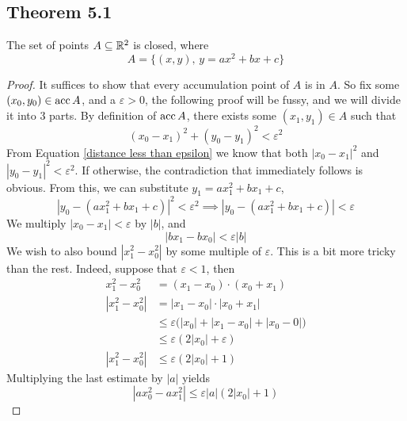 \documentclass[../../main.tex]{subfiles}
\begin{document}
\subsection{Theorem 5.1}
\begin{wts}
The set of points $A\subseteq\mathbb{R}^2$ is closed, where
\[
A = \{(x,y),\, y=ax^2 + bx + c\}
\]
\end{wts}
\begin{proof}
    It suffices to show that every accumulation point of $A$ is in $A$. So fix some $(x_0,y_0)\in \operatorname{acc}{A}$, and a $\varepsilon>0$, the following proof will be fussy, and we will divide it into 3 parts. By definition of $\operatorname{acc}{A}$, there exists some $(x_1,y_1)\in A$ such that
    \begin{equation}\label{distance less than epsilon}
        (x_0-x_1)^2 + (y_0-y_1)^2<\varepsilon^2
    \end{equation}
    From Equation \eqref{distance less than epsilon} we know that both $|x_0-x_1|^2$ and $|y_0-y_1|^2<\varepsilon^2$. If otherwise, the contradiction that immediately follows is obvious. From this, we can substitute $y_1 = ax^2_1 + bx_1 + c$, 
    \begin{equation}\label{y1 equation}
    \left|y_0 - (ax_1^2 + bx_1 + c)\right|^2<\varepsilon^2\implies \left|y_0 - (ax_1^2 + bx_1 + c)\right|<\varepsilon
    \end{equation}
    We multiply $|x_0 - x_1|<\varepsilon$ by $|b|$, and
    \begin{equation}\label{x1 b equation}
    |bx_1-bx_0|<\varepsilon|b|
    \end{equation}
    We wish to also bound $|x_1^2-x_0^2|$ by some multiple of $\varepsilon$. This is a bit more tricky than the rest. Indeed, suppose that $\varepsilon<1$, then
    \begin{align*}
        x_1^2 - x_0^2&=(x_1-x_0)\cdot(x_0+x_1)\\[1ex]
        |x_1^2 - x_0^2|&=|x_1-x_0|\cdot|x_0+x_1|\\[1ex]
        &\leq \varepsilon\biggl(|x_0| + |x_1-x_0|+|x_0-0|\biggr)\\[1ex]
        &\leq \varepsilon(2|x_0|+\varepsilon)\\[1ex]
        |x_1^2-x_0^2|&\leq \varepsilon(2|x_0|+1)
    \end{align*}
    Multiplying the last estimate by $|a|$ yields
    \begin{equation}\label{x1 a equation}
    |ax_0^2 - ax_1^2|\leq \varepsilon |a|(2|x_0|+1)
    \end{equation}

\end{proof}
\end{document}
